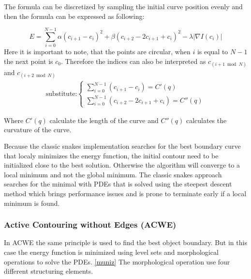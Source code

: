 The formula can be discretized by sampling the initial curve position evenly and then the formula can be expressed as following: 

\begin{equation}
    E = \sum_{i=0}^{N-1} \alpha (c_{i+1} - c_i)^2 + \beta (c_{i+2} - 2c_{i+1} + c_i)^2 - \lambda |\nabla I (c_i)|
\end{equation}
Here it is important to note, that the points are circular, when $i$ is equal to $N-1$ the next point is $c_0$. Therefore the indices can also be interpreted as $c_{(i+1 \bmod N)}$ and $c_{(i+2 \bmod N)}$
\begin{align*}
    \text {substitute:} \begin{cases}
    \sum_{i=0}^{N-1}(c_{i+1} - c_i) = C'(q) \\
    \sum_{i=0}^{N-1}(c_{i+2} - 2c_{i+1} + c_i) = C''(q)
    \end{cases}
\end{align*}

Where $C'(q)$ calculate the length of the curve and $C''(q)$ calculates the curvature of the curve.  

Because the classic snakes implementation searches for the best boundary curve that localy minimizes the energy function, the initial contour need to be initialized close to the best solution. Otherwise the algorithm will converge to a local minimum and not the global minimum. The classic snakes approach searches for the minimal with PDEs that is solved using the steepest descent method which brings performance issues and is prone to terminate early if a local minimum is found. 

\subsubsection{Active Contouring without Edges (ACWE) }
\label{sus:acwe}
In ACWE \cite{vondracek_image_2018} the same principle is used to find the best object boundary. But in this case the energy function is minimized using level sets and morphological operations to solve the PDEs. \ref{muniz} The morphological operation use four different structuring elements. 

